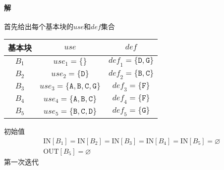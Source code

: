 \documentclass{article}
\begin{document}
\paragraph{解}
首先给出每个基本块的$\textit{use}$和$\textit{def}$集合
\begin{table}[H]
    \centering
    \begin{tabular}{|c|c|c|}
    \hline
    基本块 & $\textit{use}$ & $\textit{def}$ \\ \hline
    $B_1$ & $\textit{use}_1 = \{\}$ & $\textit{def}_1 = \{\texttt{D},\texttt{G}\}$ \\ \hline
    $B_2$ & $\textit{use}_2 = \{\texttt{D}\}$ & $\textit{def}_2 = \{\texttt{B},\texttt{C}\}$ \\ \hline
    $B_3$ & $\textit{use}_3 = \{\texttt{A},\texttt{B},\texttt{C},\texttt{G}\}$ & $\textit{def}_3 = \{\texttt{F}\}$ \\ \hline
    $B_4$ & $\textit{use}_4 = \{\texttt{A},\texttt{B},\texttt{C}\}$ & $\textit{def}_4 = \{\texttt{F}\}$ \\ \hline
    $B_5$ & $\textit{use}_5 = \{\texttt{B},\texttt{C},\texttt{D}\}$ & $\textit{def}_5 = \{\texttt{G}\}$ \\ \hline
    \end{tabular}
\end{table}
初始值
\begin{align*}
   & \text{IN}[B_1] = \text{IN}[B_2] = \text{IN}[B_3] = \text{IN}[B_4] = \text{IN}[B_5] = \varnothing \\
   & \text{OUT}[B_5] = \varnothing
\end{align*}
第一次迭代
\end{document}
